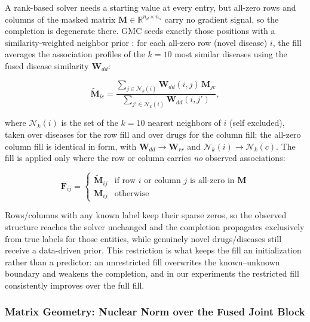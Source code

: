 \documentclass[webpdf,modern,large]{oup-authoring-template}
\newcommand{\R}{\mathbb{R}}
\begin{document}
A rank-based solver needs a starting value at every entry, but all-zero rows and columns of the masked matrix $\mathbf{M} \in \R^{n_d \times n_s}$ carry no gradient signal, so the completion is degenerate there. GMC seeds exactly those positions with a similarity-weighted neighbor prior \citep{yang2019omc2}: for each all-zero row (novel disease) $i$, the fill averages the association profiles of the $k=10$ most similar diseases using the fused disease similarity $\mathbf{W}_{dd}$:

\begin{equation}
\tilde{\mathbf{M}}_{ic} = \frac{\sum_{j \in \mathcal{N}_k(i)} \mathbf{W}_{dd}(i,j)\,\mathbf{M}_{jc}}{\sum_{j' \in \mathcal{N}_k(i)} \mathbf{W}_{dd}(i,j')},
\label{eq:knnfill}
\end{equation}

where $\mathcal{N}_k(i)$ is the set of the $k{=}10$ nearest neighbors of $i$ (self excluded), taken over diseases for the row fill and over drugs for the column fill; the all-zero column fill is identical in form, with $\mathbf{W}_{dd}\!\to\!\mathbf{W}_{rr}$ and $\mathcal{N}_k(i)\!\to\!\mathcal{N}_k(c)$. The fill is applied only where the row or column carries \emph{no} observed associations:

\begin{equation}
\mathbf{F}_{ij} = \begin{cases}
\tilde{\mathbf{M}}_{ij} & \text{if row } i \text{ or column } j \text{ is all-zero in } \mathbf{M} \\
\mathbf{M}_{ij} & \text{otherwise}
\end{cases}
\label{eq:coldstart}
\end{equation}

Rows/columns with any known label keep their sparse zeros, so the observed structure reaches the solver unchanged and the completion propagates exclusively from true labels for those entities, while genuinely novel drugs/diseases still receive a data-driven prior. This restriction is what keeps the fill an initialization rather than a predictor: an unrestricted fill overwrites the known--unknown boundary and weakens the completion, and in our experiments the restricted fill consistently improves over the full fill.

\subsubsection{Matrix Geometry: Nuclear Norm over the Fused Joint Block}
\end{document}
